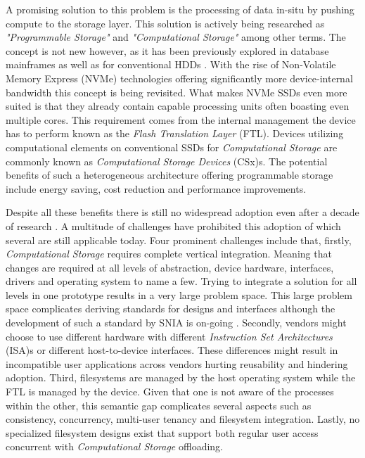 A promising solution to this problem is the processing of data in-situ by
pushing compute to the storage layer. This solution is actively being researched
as \textit{"Programmable Storage"} and \textit{"Computational Storage"} among
other terms. The concept is not new however, as it has been previously
explored in database mainframes \cite{database-computer} as well as for
conventional HDDs \cite{active-disk-pillar, active-disks-tech,
intelligent-disk}. With the rise of Non-Volatile Memory Express (NVMe)
technologies offering significantly more device-internal bandwidth this concept
is being revisited. What makes NVMe SSDs even more suited is that they already
contain capable processing units often boasting even multiple cores. This
requirement comes from the internal management the device has to perform known
as the \textit{Flash Translation Layer} (FTL). Devices utilizing computational
elements on conventional SSDs for \textit{Computational Storage} are commonly
known as \textit{Computational Storage Devices} (CSx)s. The potential benefits
of such a heterogeneous architecture offering programmable storage include
energy saving, cost reduction and performance improvements.


Despite all these benefits there is still no widespread adoption even after a
decade of research \cite{lukken2021past}. A multitude of challenges
have prohibited this adoption of which several are still applicable today. Four
prominent challenges include that, firstly, \textit{Computational Storage}
requires complete vertical integration. Meaning that changes are required at all
levels of abstraction, device hardware, interfaces, drivers and operating system
to name a few. Trying to integrate a solution for all levels in one prototype
results in a very large problem space. This large problem space complicates
deriving standards for designs and interfaces although the development of such a
standard by SNIA is on-going \cite{snia-model}. Secondly, vendors might choose
to use different hardware with different
\textit{Instruction Set Architectures} (ISA)s or different host-to-device
interfaces. These differences might result in incompatible user applications
across vendors hurting reusability and hindering adoption. Third, filesystems
are managed by the host operating system while the FTL is
managed by the device. Given that one is not aware of the processes within the
other, this semantic gap complicates several aspects such as consistency,
concurrency, multi-user tenancy and filesystem integration. Lastly, no
specialized filesystem designs exist that support both regular user access
concurrent with \textit{Computational Storage} offloading.

